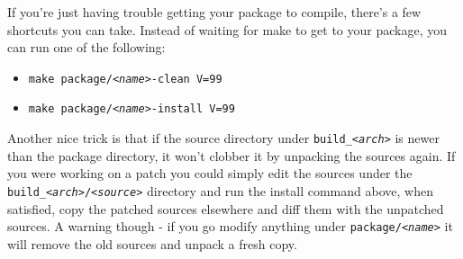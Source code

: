 If you're just having trouble getting your package to compile, there's a few
shortcuts you can take. Instead of waiting for make to get to your package, you can
run one of the following:

\begin{itemize}
	\item \texttt{make package/\textit{<name>}-clean V=99}
	\item \texttt{make package/\textit{<name>}-install V=99}
\end{itemize}

Another nice trick is that if the source directory under \texttt{build\_\textit{<arch>}}
is newer than the package directory, it won't clobber it by unpacking the sources again.
If you were working on a patch you could simply edit the sources under the
\texttt{build\_\textit{<arch>}/\textit{<source>}} directory and run the install command above,
when satisfied, copy the patched sources elsewhere and diff them with the unpatched 
sources. A warning though - if you go modify anything under \texttt{package/\textit{<name>}}
it will remove the old sources and unpack a fresh copy.

